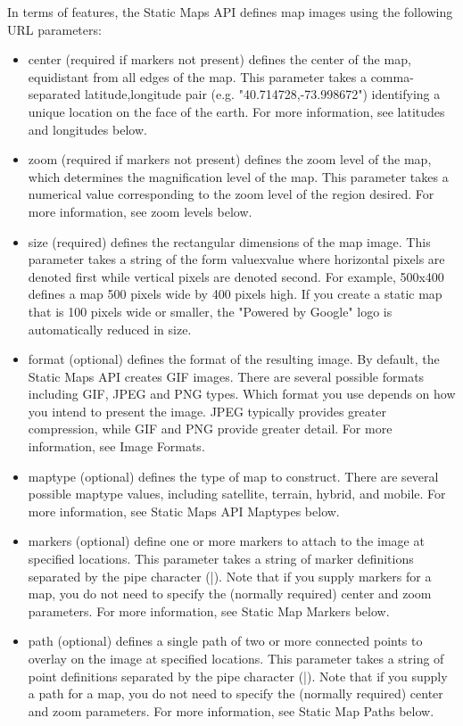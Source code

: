\documentclass{article}
\begin{document}
\noindent In terms of features, the Static Maps API defines map images using the following URL parameters:
\begin{itemize}
    \item center (required if markers not present) defines the center of the map, equidistant from all edges of the map. This parameter takes a comma-separated {latitude,longitude} pair (e.g. "40.714728,-73.998672") identifying a unique location on the face of the earth. For more information, see latitudes and longitudes below.
    \item zoom (required if markers not present) defines the zoom level of the map, which determines the magnification level of the map. This parameter takes a numerical value corresponding to the zoom level of the region desired. For more information, see zoom levels below.
    \item size (required) defines the rectangular dimensions of the map image. This parameter takes a string of the form valuexvalue where horizontal pixels are denoted first while vertical pixels are denoted second. For example, 500x400 defines a map 500 pixels wide by 400 pixels high. If you create a static map that is 100 pixels wide or smaller, the "Powered by Google" logo is automatically reduced in size.
    \item format (optional) defines the format of the resulting image. By default, the Static Maps API creates GIF images. There are several possible formats including GIF, JPEG and PNG types. Which format you use depends on how you intend to present the image. JPEG typically provides greater compression, while GIF and PNG provide greater detail. For more information, see Image Formats.
    \item maptype (optional) defines the type of map to construct. There are several possible maptype values, including satellite, terrain, hybrid, and mobile. For more information, see Static Maps API Maptypes below.
    \item markers (optional) define one or more markers to attach to the image at specified locations. This parameter takes a string of marker definitions separated by the pipe character (|). Note that if you supply markers for a map, you do not need to specify the (normally required) center and zoom parameters. For more information, see Static Map Markers below.
    \item path (optional) defines a single path of two or more connected points to overlay on the image at specified locations. This parameter takes a string of point definitions separated by the pipe character (|). Note that if you supply a path for a map, you do not need to specify the (normally required) center and zoom parameters. For more information, see Static Map Paths below.

\end{itemize}
\end{document}
